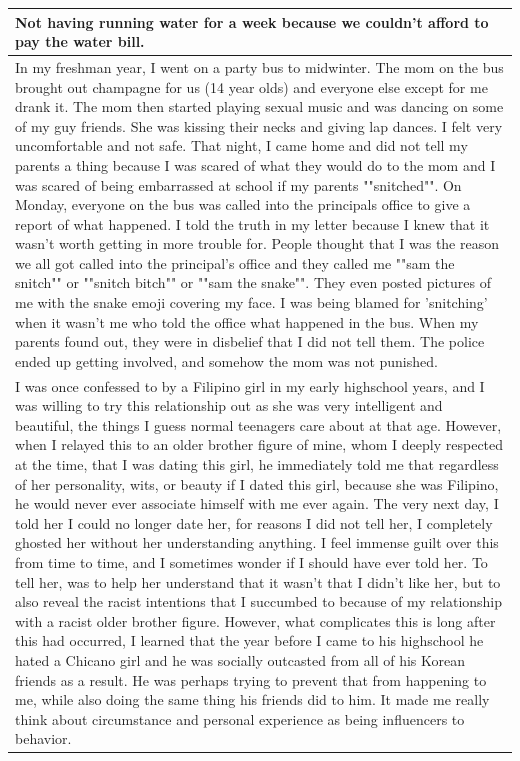 \documentclass[
  .7em,
  letterpaper,
  DIV=11,
  numbers=noendperiod]{scrartcl}
\begin{document}
\begin{table}
\begin{tabular}{l}
\hline
Not having running water for a week because we couldn't afford to pay the water bill.\\
\hline
In my freshman year, I went on a party bus to midwinter. The mom on the bus brought out champagne for us (14 year olds) and everyone else except for me drank it. The mom then started playing sexual music and was dancing on some of my guy friends. She was kissing their necks and giving lap dances. I felt very uncomfortable and not safe. That night, I came home and did not tell my parents a thing because I was scared of what they would do to the mom and I was scared of being embarrassed at school if my parents ""snitched"". On Monday, everyone on the bus was called into the principals office to give a report of what happened. I told the truth in my letter because I knew that it wasn't worth getting in more trouble for. People thought that I was the reason we all got called into the principal's office and they called me ""sam the snitch"" or ""snitch bitch"" or ""sam the snake"". They even posted pictures of me with the snake emoji covering my face. I was being blamed for 'snitching' when it wasn't me who told the office what happened in the bus. When my parents found out, they were in disbelief that I did not tell them. The police ended up getting involved, and somehow the mom was not punished.\\
\hline
I was once confessed to by a Filipino girl in my early highschool years, and I was willing to try this relationship out as she was very intelligent and beautiful, the things I guess normal teenagers care about at that age. However, when I relayed this to an older brother figure of mine, whom I deeply respected at the time, that I was dating this girl, he immediately told me that regardless of her personality, wits, or beauty if I dated this girl, because she was Filipino, he would never ever associate himself with me ever again. The very next day, I told her I could no longer date her, for reasons I did not tell her, I completely ghosted her without her understanding anything. I feel immense guilt over this from time to time, and I sometimes wonder if I should have ever told her. To tell her, was to help her understand that it wasn't that I didn't like her, but to also reveal the racist intentions that I succumbed to because of my relationship with a racist older brother figure. However, what complicates this is long after this had occurred, I learned that the year before I came to his highschool he hated a Chicano girl and he was socially outcasted from all of his Korean friends as a result. He was perhaps trying to prevent that from happening to me, while also doing the same thing his friends did to him. It made me really think about circumstance and personal experience as being influencers to behavior.\\

\end{tabular}
\end{table}
\end{document}
